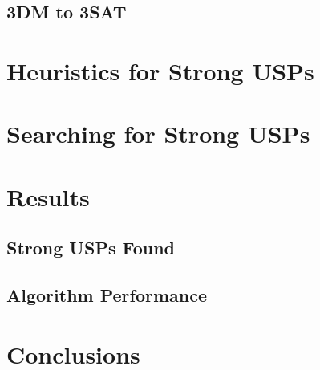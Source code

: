 \documentclass[11pt]{article}
\begin{document}
\subsection{3DM to 3SAT}
\label{subsec:3sat}

\section{Heuristics for Strong USPs}
\label{sec:heuristic}

\section{Searching for Strong USPs}
\label{sec:search}

\section{Results}
\label{sec:results}

\subsection{Strong USPs Found}
\label{subsec:usps_found}

\subsection{Algorithm Performance}
\label{subsec:performance}

\section{Conclusions}
\label{sec:conclusion}



 

\appendix
\end{document}
